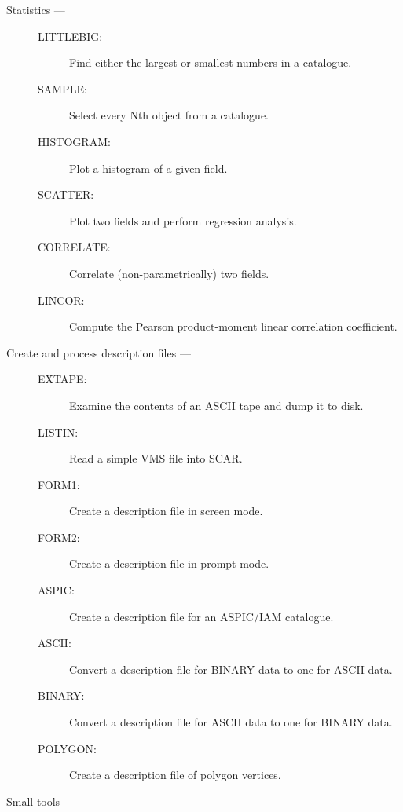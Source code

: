 \begin{description}
\item [Statistics ---]

\begin{description}
\item [LITTLEBIG:]  Find either the largest or smallest numbers in a catalogue.
\item [SAMPLE:]  Select every Nth object from a catalogue.
\item [HISTOGRAM:]  Plot a histogram of a given field.
\item [SCATTER:]  Plot two fields and perform regression analysis.
\item [CORRELATE:]  Correlate (non-parametrically) two fields.
\item [LINCOR:]  Compute the Pearson product-moment linear correlation
  coefficient.
\end{description}

\item [Create and process description files ---]

\begin{description}
\item [EXTAPE:]  Examine the contents of an ASCII tape and dump it to disk.
\item [LISTIN:]  Read a simple VMS file into SCAR.
\item [FORM1:]  Create a description file in screen mode.
\item [FORM2:]  Create a description file in prompt mode.
\item [ASPIC:]  Create a description file for an ASPIC/IAM catalogue.
\item [ASCII:]  Convert a description file for BINARY data to one for ASCII
 data.
\item [BINARY:]  Convert a description file for ASCII data to one for BINARY
 data.
\item [POLYGON:]  Create a description file of polygon vertices.
\end{description}

\item [Small tools ---]


\end{description}
